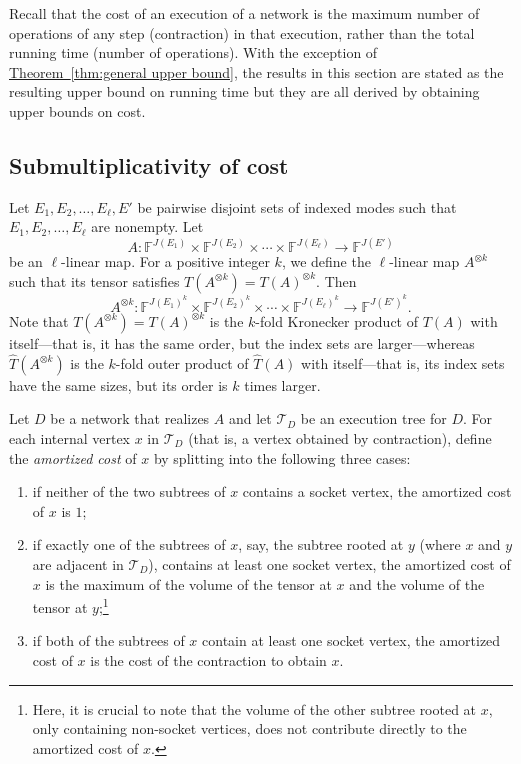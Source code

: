 \documentclass[11pt]{article}
\numberwithin{equation}{section}
\theoremstyle{definition}
\theoremstyle{plain}
\newcommand{\expref}[2]{\hyperref[#2]{#1~\ref{#2}}}
\newcommand{\F}{\ensuremath{\mathbb{F}}}
\newcommand{\td}{\ensuremath{\mathcal{T}_D}}
\begin{document}
Recall that the cost of an execution of a network is the maximum
number of operations of any step (contraction) in that execution,
rather than the total running time (number of operations).  With the
exception of \expref{Theorem}{thm:general upper bound}, the results in
this section are stated as the resulting upper bound on running time
but they are all derived by obtaining upper bounds on cost.

\subsection{Submultiplicativity of cost}
\label{sec:submultiplicativity}

Let $E_1,E_2,\ldots,E_\ell,E'$ be pairwise disjoint sets of indexed modes
such that $E_1,E_2,\ldots,E_\ell$ are nonempty. Let
\[
A:\F^{J(E_1)}\times\F^{J(E_2)}\times\cdots \times\F^{J(E_\ell)}
      \rightarrow \F^{J(E')}
\]
be an $\ell$-linear map.
For a positive integer $k$, we
define the $\ell$-linear map $A^{\otimes k}$ such that its tensor satisfies $T(A^{\otimes k})=T(A)^{\otimes k}$.  Then
\[
A^{\otimes k}:\F^{J(E_1)^k}\times\F^{J(E_2)^k}\times\cdots \times\F^{J(E_\ell)^k}
      \rightarrow \F^{J(E')^k}.
\]
Note that $T(A^{\otimes k}) = T(A)^{\otimes k}$ is the $k$-fold
Kronecker product of $T(A)$ with itself---that is, it has the same order,
but the index sets are larger---whereas $\hat{T}(A^{\otimes k})$ is
the $k$-fold outer product of $\hat{T}(A)$ with itself---that is, its
index sets have the same sizes, but its order is $k$ times larger.

Let $D$ be a network that realizes $A$ and let $\td$ be an execution
tree for $D$.
For each internal vertex $x$ in $\td$ (that is, a vertex obtained by contraction),
define the \emph{amortized cost} of $x$ by splitting into the following
three cases:
\begin{enumerate}%
\item
if neither of the two subtrees of $x$ contains a socket vertex,
the amortized cost of $x$ is $1$;
\item
if exactly one of the subtrees of $x$,
say, the subtree rooted at $y$ (where $x$ and $y$ are adjacent in $\td$),
contains at least one socket vertex, the amortized cost of
$x$ is the maximum of the volume of the tensor at $x$ and the volume of
the tensor at $y$;\footnote{Here, it is crucial to note that the volume of the other subtree rooted at $x$, only containing non-socket vertices, does not contribute directly to the amortized cost of $x$.}
\item
if both of the subtrees of $x$ contain at
least one socket vertex, the amortized cost of $x$ is the
cost of the contraction to obtain $x$.
\end{enumerate}
\end{document}
